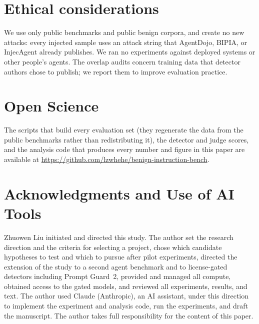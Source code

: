 \section*{Ethical considerations}
We use only public benchmarks and public benign corpora, and create no new attacks: every injected sample uses an attack string that AgentDojo, BIPIA, or InjecAgent already publishes. We ran no experiments against deployed systems or other people's agents. The overlap audits concern training data that detector authors chose to publish; we report them to improve evaluation practice.

\section*{Open Science}
The scripts that build every evaluation set (they regenerate the data from the public benchmarks rather than redistributing it), the detector and judge scores, and the analysis code that produces every number and figure in this paper are available at \url{https://github.com/lzwhehe/benign-instruction-bench}.

\section*{Acknowledgments and Use of AI Tools}
Zhuowen Liu initiated and directed this study. The author set the research direction and the criteria for selecting a project, chose which candidate hypotheses to test and which to pursue after pilot experiments, directed the extension of the study to a second agent benchmark and to license-gated detectors including Prompt Guard~2, provided and managed all compute, obtained access to the gated models, and reviewed all experiments, results, and text. The author used Claude (Anthropic), an AI assistant, under this direction to implement the experiment and analysis code, run the experiments, and draft the manuscript. The author takes full responsibility for the content of this paper.
